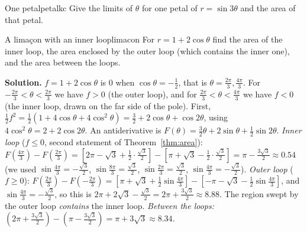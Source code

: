 \documentclass[11pt]{article}
\begin{document}
\begin{kc}{One petal}{petalkc}
Give the limits of $\theta$ for one petal of $r=\sin3\theta$ and the area of that petal.
\end{kc}


\begin{exmp}{A limaçon with an inner loop}{limacon}
For $r=1+2\cos\theta$ find the area of the inner loop, the area enclosed by the outer loop (which contains the inner one), and the area between the loops.

\textbf{Solution.} $f=1+2\cos\theta$ is $0$ when $\cos\theta=-\frac12$, that is $\theta=\frac{2\pi}3,\frac{4\pi}3$. For $-\frac{2\pi}3<\theta<\frac{2\pi}3$ we have $f>0$ (the outer loop), and for $\frac{2\pi}3<\theta<\frac{4\pi}3$ we have $f<0$ (the inner loop, drawn on the far side of the pole). First, $\frac12f^2=\frac12\left(1+4\cos\theta+4\cos^2\theta\right)=\frac32+2\cos\theta+\cos2\theta$, using $4\cos^2\theta=2+2\cos2\theta$. An antiderivative is $F(\theta)=\frac32\theta+2\sin\theta+\frac12\sin2\theta$.
\emph{Inner loop} ($f\le0$, second statement of Theorem~\ref{thm:area}): $F\left(\frac{4\pi}3\right)-F\left(\frac{2\pi}3\right)=\left[2\pi-\sqrt3+\frac12\cdot\frac{\sqrt3}2\right]-\left[\pi+\sqrt3-\frac12\cdot\frac{\sqrt3}2\right]=\pi-\frac{3\sqrt3}2\approx0.54$ (we used $\sin\frac{4\pi}3=-\frac{\sqrt3}2$, $\sin\frac{8\pi}3=\frac{\sqrt3}2$, $\sin\frac{2\pi}3=\frac{\sqrt3}2$, $\sin\frac{4\pi}3=-\frac{\sqrt3}2$).
\emph{Outer loop} ($f\ge0$): $F\left(\frac{2\pi}3\right)-F\left(-\frac{2\pi}3\right)=\left[\pi+\sqrt3+\frac12\sin\frac{4\pi}3\right]-\left[-\pi-\sqrt3-\frac12\sin\frac{4\pi}3\right]$, and $\sin\frac{4\pi}3=-\frac{\sqrt3}2$, so this is $2\pi+2\sqrt3-\frac{\sqrt3}2=2\pi+\frac{3\sqrt3}2\approx8.88$. The region swept by the outer loop \emph{contains} the inner loop. \emph{Between the loops:} $\left(2\pi+\frac{3\sqrt3}2\right)-\left(\pi-\frac{3\sqrt3}2\right)=\pi+3\sqrt3\approx8.34$.

\end{exmp}
\end{document}
